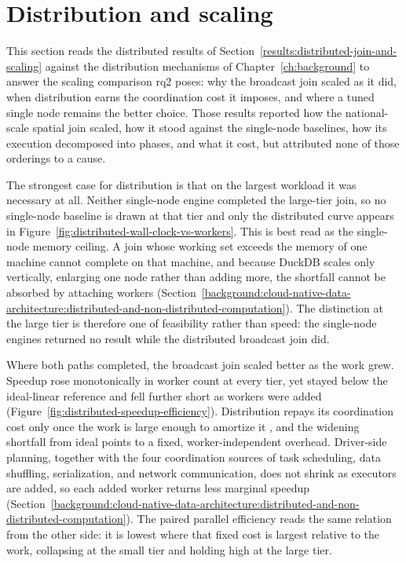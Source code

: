 \section{Distribution and scaling}
\label{discussion:distribution-and-scaling}

This section reads the distributed results of Section~\ref{results:distributed-join-and-scaling} against the distribution mechanisms of Chapter~\ref{ch:background} to answer the scaling comparison \acrshort{rq}2 poses: why the broadcast join scaled as it did, when distribution earns the coordination cost it imposes, and where a tuned single node remains the better choice. Those results reported how the national-scale spatial join scaled, how it stood against the single-node baselines, how its execution decomposed into phases, and what it cost, but attributed none of those orderings to a cause.

The strongest case for distribution is that on the largest workload it was necessary at all. Neither single-node engine completed the large-tier join, so no single-node baseline is drawn at that tier and only the distributed curve appears in Figure~\ref{fig:distributed-wall-clock-vs-workers}. This is best read as the single-node memory ceiling. A join whose working set exceeds the memory of one machine cannot complete on that machine, and because DuckDB scales only vertically, enlarging one node rather than adding more, the shortfall cannot be absorbed by attaching workers \parencite{duckdb2025_scalability_faq} (Section~\ref{background:cloud-native-data-architecture:distributed-and-non-distributed-computation}). The distinction at the large tier is therefore one of feasibility rather than speed: the single-node engines returned no result while the distributed broadcast join did.

Where both paths completed, the broadcast join scaled better as the work grew. Speedup rose monotonically in worker count at every tier, yet stayed below the ideal-linear reference and fell further short as workers were added (Figure~\ref{fig:distributed-speedup-efficiency}). Distribution repays its coordination cost only once the work is large enough to amortize it \parencite{mcsherry2015_scalability_but_at_what_cost,zaharia2012_resilient_distributed_datasets}, and the widening shortfall from ideal points to a fixed, worker-independent overhead. Driver-side planning, together with the four coordination sources of task scheduling, data shuffling, serialization, and network communication, does not shrink as executors are added, so each added worker returns less marginal speedup \parencite{mcsherry2015_scalability_but_at_what_cost} (Section~\ref{background:cloud-native-data-architecture:distributed-and-non-distributed-computation}). The paired parallel efficiency reads the same relation from the other side: it is lowest where that fixed cost is largest relative to the work, collapsing at the small tier and holding high at the large tier.

